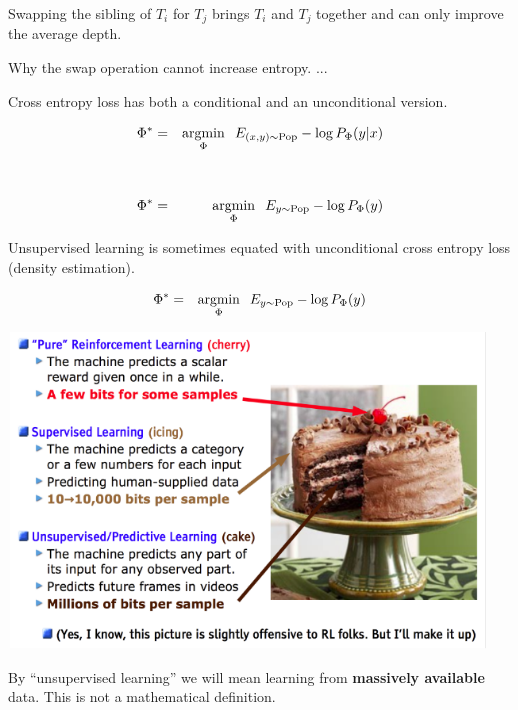 {\vfill
Swapping the sibling of $T_i$ for $T_j$ brings $T_i$ and $T_j$ together and can only improve the average depth.


Why the swap operation cannot increase entropy. ...


Cross entropy loss has both a conditional and an unconditional version.

\vfill
\begin{eqnarray*}
  \Phi^* & = & \operatorname*{argmin}_\Phi \;\;E_{(x,y) \sim \mathrm{Pop}}  -\log P_\Phi(y|x) \\
  \\
  \\
  \Phi^* & = & \operatorname*{argmin}_\Phi \;\;E_{y \sim \mathrm{Pop}}  -\log P_\Phi(y)
\end{eqnarray*}


Unsupervised learning is sometimes equated with unconditional cross entropy loss (density estimation).

\vfill
\begin{eqnarray*}
  \Phi^* & = & \operatorname*{argmin}_\Phi \;\;E_{y \sim \mathrm{Pop}}  -\log P_\Phi(y)
\end{eqnarray*}


\centerline{\includegraphics[width = 8in]{../images/cake}}



By ``unsupervised learning'' we will mean learning from {\bf massively available} data.  This is not a mathematical definition.

}
